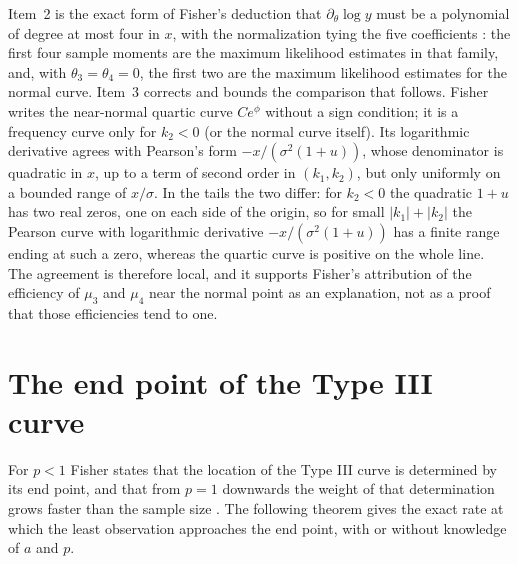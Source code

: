 Item~2 is the exact form of Fisher's deduction that \(\partial_\theta\log
y\) must be a polynomial of degree at most four in \(x\), with the
normalization tying the five coefficients
\cite[p.~356]{Fisher1922Foundations}: the first four sample moments are the
maximum likelihood estimates in that family, and, with \(\theta_3=\theta_4=0\),
the first two are the maximum likelihood estimates for the normal curve.
Item~3 corrects and bounds the comparison that follows. Fisher writes the
near-normal quartic curve \(Ce^{\phi}\) without a sign condition; it is a
frequency curve only for \(k_2<0\) (or the normal curve itself). Its
logarithmic derivative agrees with Pearson's form
\(-x/(\sigma^2(1+u))\), whose denominator is quadratic in \(x\), up to a
term of second order in \((k_1,k_2)\), but only uniformly on a bounded
range of \(x/\sigma\). In the tails the two differ: for \(k_2<0\) the
quadratic \(1+u\) has two real zeros, one on each side of the origin, so
for small \(|k_1|+|k_2|\) the Pearson curve with
logarithmic derivative \(-x/(\sigma^2(1+u))\) has a finite range ending at
such a zero, whereas the quartic curve is positive on the whole line. The
agreement is therefore local, and it supports Fisher's
attribution of the efficiency of \(\mu_3\) and \(\mu_4\) near the normal
point \cite[p.~356]{Fisher1922Foundations} as an explanation, not as a proof
that those efficiencies tend to one.

\section{The end point of the Type III curve}
\label{sec:p15-w02b-p15-057-endpoint}

For \(p<1\) Fisher states that the location of the Type III curve is
determined by its end point, and that from \(p=1\) downwards the weight of
that determination grows faster than the sample size
\cite[p.~337]{Fisher1922Foundations}. The following theorem gives the
exact rate at which the least observation approaches the end point, with
or without knowledge of \(a\) and \(p\).

